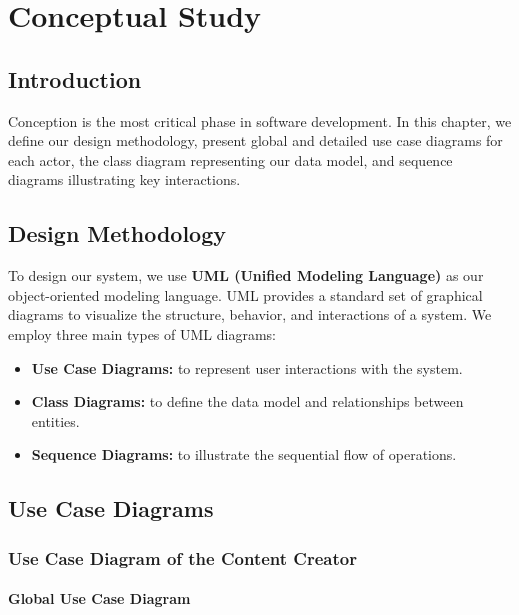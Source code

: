 \chapter{Conceptual Study}

\section*{Introduction}
Conception is the most critical phase in software development. In this chapter, we define our design methodology, present global and detailed use case diagrams for each actor, the class diagram representing our data model, and sequence diagrams illustrating key interactions.

\section{Design Methodology}

To design our system, we use \textbf{UML (Unified Modeling Language)} as our object-oriented modeling language. UML provides a standard set of graphical diagrams to visualize the structure, behavior, and interactions of a system. We employ three main types of UML diagrams:

\begin{itemize}
    \item \textbf{Use Case Diagrams:} to represent user interactions with the system.
    \item \textbf{Class Diagrams:} to define the data model and relationships between entities.
    \item \textbf{Sequence Diagrams:} to illustrate the sequential flow of operations.
\end{itemize}

\section{Use Case Diagrams}

\subsection{Use Case Diagram of the Content Creator}

\subsubsection{Global Use Case Diagram}

